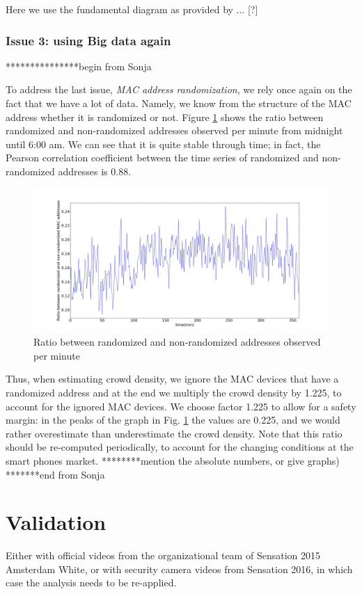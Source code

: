 \documentclass[10pt,a4paper]{article}
\begin{document}
Here we use the fundamental diagram as provided by ... [?]


\subsubsection{Issue 3: using Big data again}

***************begin from Sonja

To address the last issue, {\it MAC address randomization}, we rely once again on the fact that we have a lot of data. Namely, we know from the structure of the MAC address whether it is randomized or not. Figure \ref{fig:randomized} shows the ratio between randomized and non-randomized addresses observed per minute from midnight until 6:00 am. We can see that it is quite stable through time; in fact, the Pearson correlation coefficient between the time series of randomized and non-randomized addresses is 0.88. 

\begin{figure}[h!]
	\centering
	\includegraphics[width=130mm]{RatioRandNonrand.jpeg}
	\caption{Ratio between randomized and non-randomized addresses observed per minute}
	\label{fig:randomized}
\end{figure} 

Thus, when estimating crowd density, we ignore the MAC devices that have a randomized address and at the end we multiply the crowd density by 1.225, to account for the ignored MAC devices. We choose factor 1.225 to allow for a safety margin: in the peaks of the graph in Fig. \ref{fig:randomized} the values are 0.225, and we would rather overestimate than underestimate the crowd density. 
Note that this ratio should be re-computed periodically, to account for the changing conditions at the smart phones market. 
********mention the absolute numbers, or give graphs)
*******end from Sonja


\section{Validation}\label{sec:validation}
Either with official videos from the organizational team of  Sensation 2015 Amsterdam White, or with security camera videos from Sensation 2016, in which case the analysis needs to be re-applied.
\end{document}
